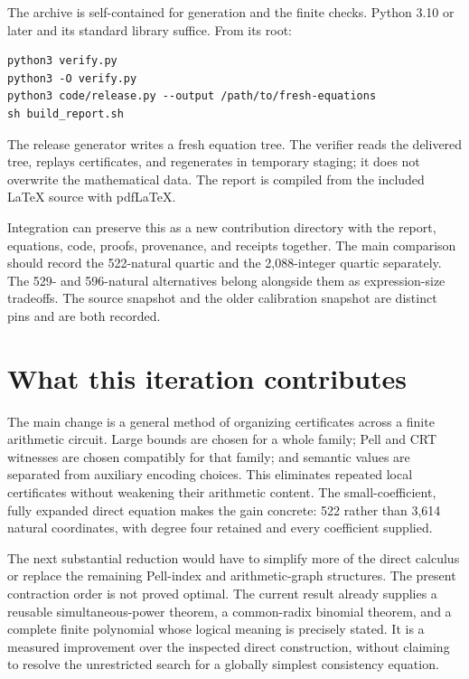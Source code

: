 \documentclass[11pt,letterpaper]{article}
\theoremstyle{definition}\newtheorem{definition}[theorem]{Definition}
\theoremstyle{remark}\newtheorem{remark}[theorem]{Remark}
\begin{document}
The archive is self-contained for generation and the finite checks.
Python 3.10 or later and its standard library suffice. From its root:
\begin{verbatim}
python3 verify.py
python3 -O verify.py
python3 code/release.py --output /path/to/fresh-equations
sh build_report.sh
\end{verbatim}
The release generator writes a fresh equation tree. The verifier reads the
delivered tree, replays certificates, and regenerates in temporary staging;
it does not overwrite the mathematical data. The report is compiled from
the included LaTeX source with pdfLaTeX.

Integration can preserve this as a new contribution directory with the
report, equations, code, proofs, provenance, and receipts together. The
main comparison should record the 522-natural quartic and the
2,088-integer quartic separately. The 529- and 596-natural alternatives
belong alongside them as expression-size tradeoffs. The source snapshot
and the older calibration snapshot are distinct pins and are both recorded.

\section{What this iteration contributes}

The main change is a general method of organizing certificates across a
finite arithmetic circuit. Large bounds are chosen for a whole family;
Pell and CRT witnesses are chosen compatibly for that family; and
semantic values are separated from auxiliary encoding choices. This
eliminates repeated local certificates without weakening their arithmetic
content. The small-coefficient, fully expanded direct equation makes the
gain concrete: 522 rather than 3,614 natural coordinates, with degree
four retained and every coefficient supplied.

The next substantial reduction would have to simplify more of the direct
calculus or replace the remaining Pell-index and arithmetic-graph
structures. The present contraction order is not proved optimal. The
current result already supplies a reusable simultaneous-power theorem,
a common-radix binomial theorem, and a complete finite polynomial whose
logical meaning is precisely stated. It is a measured improvement over
the inspected direct construction, without claiming to resolve the
unrestricted search for a globally simplest consistency equation.
\end{document}
